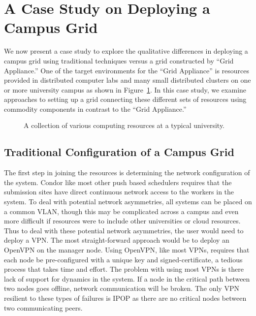 \documentclass[conference]{IEEEtran}
\begin{document}
\section{A Case Study on Deploying a Campus Grid}
\label{case_study}

We now present a case study to explore the qualitative differences in deploying
a campus grid using traditional techniques versus a grid constructed by ``Grid
Appliance.''  One of the target environments for the ``Grid Appliance'' is
resources provided in distributed computer labs and many small distributed
clusters on one or more university campus as shown in
Figure~\ref{fig:unconnected}.  In this case study, we examine approaches to
setting up a grid connecting these different sets of resources using commodity
components in contrast to the ``Grid Appliance.''

\begin{figure}[ht]
\centering
{}
\caption{A collection of various computing resources at a typical university.}
\label{fig:unconnected}
\end{figure}

\subsection{Traditional Configuration of a Campus Grid}

The first step in joining the resources is determining the network
configuration of the system.  Condor like most other push based schedulers
requires that the submission sites have direct continuous network access to the
workers in the system.  To deal with potential network asymmetries, all systems
can be placed on a common VLAN, though this may be complicated across a campus
and even more difficult if resources were to include other universities or
cloud resources.  Thus to deal with these potential network asymmetries, the
user would need to deploy a VPN.  The most straight-forward approach would be
to deploy an OpenVPN on the manager node.  Using OpenVPN, like most VPNs,
requires that each node be pre-configured with a unique key and
signed-certificate, a tedious process that takes time and effort.  The problem
with using most VPNs is there lack of support for dynamics in the system.  If a
node in the critical path between two nodes goes offline, network communication
will be broken.  The only VPN resilient to these types of failures is IPOP as
there are no critical nodes between two communicating peers.
\end{document}
